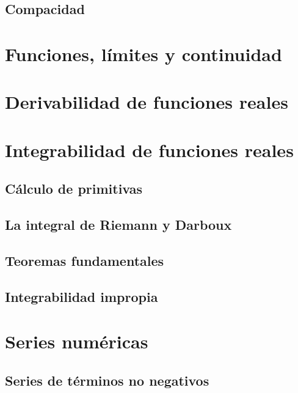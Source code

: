 \documentclass{article}
\begin{document}
\subsection{Compacidad}





\section{Funciones, límites y continuidad}






\section{Derivabilidad de funciones reales}







\section{Integrabilidad de funciones reales}

\subsection{Cálculo de primitivas}

\subsection{La integral de Riemann y Darboux}

\subsection{Teoremas fundamentales}

\subsection{Integrabilidad impropia}





\section{Series numéricas}

\subsection{Series de términos no negativos}
\end{document}
